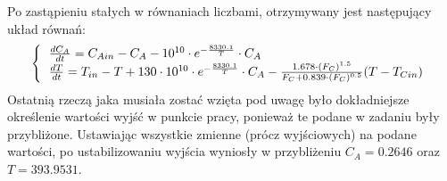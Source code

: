 Po zastąpieniu stałych w równaniach liczbami, otrzymywany jest następujący układ równań:\\
\begin{equation}
	\left\{
	\begin{tabular}{l}
	$\frac{dC_A}{dt} = C_{Ain} - C_A - 10^{10}\cdot e^{-\frac{8330.1}{T}}\cdot C_A$\\
	$\frac{dT}{dt} = T_{in} - T + 130\cdot 10^{10}\cdot e^{-\frac{8330.1}{T}}\cdot C_A-\frac{1.678\cdot (F_C)^{1.5}}{F_C+0.839\cdot (F_C)^{0.5}}(T-T_{Cin})$
	\end{tabular}
	\right.
\end{equation}
Ostatnią rzeczą jaka musiała zostać wzięta pod uwagę było dokładniejsze określenie wartości wyjść w punkcie pracy, ponieważ te podane w zadaniu były przybliżone. Ustawiając wszystkie zmienne (prócz wyjściowych) na podane wartości, po ustabilizowaniu wyjścia wyniosły w przybliżeniu $C_A = 0.2646$ oraz $T = 393.9531$.

